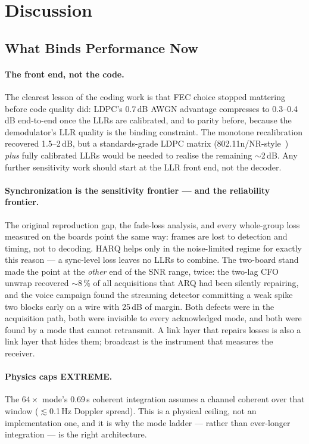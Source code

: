 \section{Discussion}
\label{sec:discussion}

\subsection{What Binds Performance Now}

\paragraph{The front end, not the code.}  The clearest lesson of the
coding work is that FEC choice stopped mattering before code quality
did: LDPC's 0.7\,dB AWGN advantage compresses to 0.3--0.4\,dB
end-to-end once the LLRs are calibrated, and to parity before, because
the demodulator's LLR quality is the binding constraint.  The monotone
recalibration recovered 1.5--2\,dB, but a standards-grade LDPC matrix
(802.11n/NR-style~\cite{ieee80211}) \emph{plus} fully calibrated LLRs
would be needed to realise the remaining $\sim$2\,dB.  Any further
sensitivity work should start at the LLR front end, not the decoder.

\paragraph{Synchronization is the sensitivity frontier --- and the
reliability frontier.}  The original reproduction gap, the fade-loss
analysis, and every whole-group loss measured on the boards point the
same way: frames are lost to detection and timing, not to decoding.
HARQ helps only in the noise-limited regime for exactly this reason ---
a sync-level loss leaves no LLRs to combine.  The two-board stand made
the point at the \emph{other} end of the SNR range, twice: the
two-lag CFO unwrap recovered $\sim$8\,\% of all acquisitions that ARQ
had been silently repairing, and the voice campaign found the
streaming detector committing a weak spike two blocks early on a wire
with 25\,dB of margin.  Both defects were in the acquisition path,
both were invisible to every acknowledged mode, and both were found by
a mode that cannot retransmit.  A link layer that repairs losses is
also a link layer that hides them; broadcast is the instrument that
measures the receiver.

\paragraph{Physics caps EXTREME.}  The $64\times$ mode's 0.69\,s
coherent integration assumes a channel coherent over that window
($\lesssim$0.1\,Hz Doppler spread).  This is a physical ceiling, not
an implementation one, and it is why the mode ladder --- rather than
ever-longer integration --- is the right architecture.

